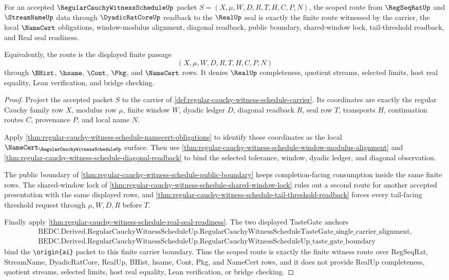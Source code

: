 \begin{theorem}
\label{thm:regular-cauchy-witness-schedule-scope-closed-route}
For an accepted $\RegularCauchyWitnessScheduleUp$ packet $S=(X,\mu,W,D,R,T,H,C,P,N)$, the scoped route from $\RegSeqRatUp$ and $\StreamNameUp$ data through $\DyadicRatCoreUp$ readback to the $\RealUp$ seal is exactly the finite route witnessed by the carrier, the local $\NameCert$ obligations, window-modulus alignment, diagonal readback, public boundary, shared-window lock, tail-threshold readback, and Real seal readiness.

Equivalently, the route is the displayed finite passage
$$
(X,\mu,W,D,R,T,H,C,P,N)
$$
through $\BHist$, $\hsame$, $\Cont$, $\Pkg$, and $\NameCert$ rows. It denies $\RealUp$ completeness, quotient streams, selected limits, host real equality, Lean verification, and bridge checking.
\end{theorem}
\begin{proof}
Project the accepted packet $S$ to the carrier of \autoref{def:regular-cauchy-witness-schedule-carrier}. Its coordinates are exactly the regular Cauchy family row $X$, modulus row $\mu$, finite window $W$, dyadic ledger $D$, diagonal readback $R$, seal row $T$, transports $H$, continuation routes $C$, provenance $P$, and local name $N$.

Apply \autoref{thm:regular-cauchy-witness-schedule-namecert-obligations} to identify those coordinates as the local $\NameCert_{\RegularCauchyWitnessScheduleUp}$ surface. Then use \autoref{thm:regular-cauchy-witness-schedule-window-modulus-alignment} and \autoref{thm:regular-cauchy-witness-schedule-diagonal-readback} to bind the selected tolerance, window, dyadic ledger, and diagonal observation.

The public boundary of \autoref{thm:regular-cauchy-witness-schedule-public-boundary} keeps completion-facing consumption inside the same finite rows. The shared-window lock of \autoref{thm:regular-cauchy-witness-schedule-shared-window-lock} rules out a second route for another accepted presentation with the same displayed rows, and \autoref{thm:regular-cauchy-witness-schedule-tail-threshold-readback} forces every tail-facing threshold request through $\mu,W,D,R$ before $T$.

Finally apply \autoref{thm:regular-cauchy-witness-schedule-real-seal-readiness}. The two displayed TasteGate anchors
$$
\begin{gathered}
\text{BEDC.Derived.RegularCauchyWitnessScheduleUp.RegularCauchyWitnessScheduleTasteGate\_single\_carrier\_alignment},\\
\text{BEDC.Derived.RegularCauchyWitnessScheduleUp.RegularCauchyWitnessScheduleUp\_taste\_gate\_boundary}
\end{gathered}
$$
bind the \texttt{\textbackslash origin\{ai\}} packet to this finite carrier boundary. Thus the scoped route is exactly the finite witness route over RegSeqRat, StreamName, DyadicRatCore, RealUp, BHist, hsame, Cont, Pkg, and NameCert rows, and it does not provide RealUp completeness, quotient streams, selected limits, host real equality, Lean verification, or bridge checking.
\end{proof}

